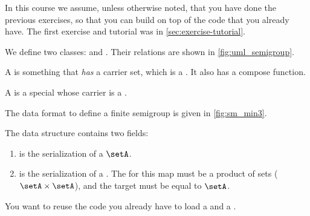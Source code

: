 
\begin{remark}
    In this course we assume, unless otherwise noted, that you have done the previous exercises, so that you can build on top of the code that you already have.
    The first exercise and tutorial was in \cref{sec:exercise-tutorial}.
\end{remark}

\begin{figure*}[b]
    \caption{}
    \label{fig:uml_semigroup}
\end{figure*}

We define two classes: \Semigroup and \FiniteSemigroup.
Their relations are shown in \cref{fig:uml_semigroup}.

A \Semigroup is something that \emph{has} a carrier set, which is a \Setoid.
It also has a compose function.


A \FiniteSemigroup is a special \Semigroup whose carrier is a \FiniteSet.


\begin{marginfigure}%
    \caption{}%
    \label{fig:sm_min3}%
\end{marginfigure}%

The data format to define a finite semigroup is given in \cref{fig:sm_min3}.

The data structure contains two fields:
\begin{enumerate}
    \item {} is the serialization of a \FiniteSet $\setA$.
    \item {} is the serialization of a \FiniteMap.
          The  for this map must be a product of sets ($\setA \times \setA$), and the target must be equal to $\setA$.
\end{enumerate}



\begin{hint}
    You want to reuse the code you already have to load a \FiniteSet and a \FiniteMap.
\end{hint}


